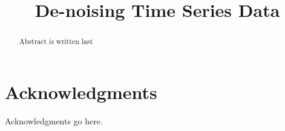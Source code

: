 \documentclass[conference,peerreviewca]{IEEEtran}
\begin{document}
  \title{De-noising Time Series Data}
  \author{
  }

  \IEEEoverridecommandlockouts
  \maketitle
  \IEEEpubidadjcol

  \begin{abstract}
    Abstract is written last
  \end{abstract}

  \IEEEpeerreviewmaketitle

  
  
  
  
  
  

  \section*{Acknowledgments}
  Acknowledgments go here.

  \FloatBarrier
  
  
\end{document}
